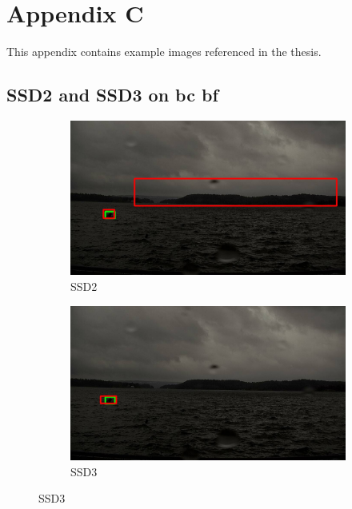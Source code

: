 \chapter{Appendix C}
This appendix contains example images referenced in the thesis.


\newpage

\section{SSD2 and SSD3 on bc bf}
\label{sec:bigbox}

\begin{figure}[h!]
\begin{subfigure}{.5\textwidth}
  \centering
  \includegraphics[width=0.9\linewidth]{results/case_buildings/bigbox_bcbf/SSD2/selected_06_14_axis0049.jpg}
  \caption{SSD2}
  \label{fig:sfig1}
\end{subfigure}%
\begin{subfigure}{.5\textwidth}
  \centering
  \includegraphics[width=.9\linewidth]{results/case_buildings/bigbox_bcbf/SSD3/selected_06_14_axis0049.jpg}
  \caption{SSD3}
  \label{fig:sfig2}
\end{subfigure}


\end{figure}
